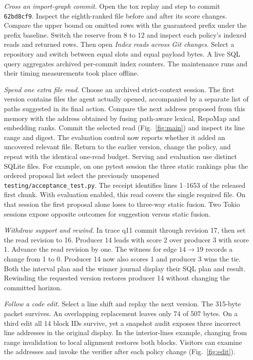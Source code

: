 \documentclass[conference]{IEEEtran}
\begin{document}
\textit{Cross an import-graph commit.} Open the tox replay and step to commit \texttt{62bd8cf9}. Inspect the eighth-ranked file before and after its score changes. Compare the upper bound on omitted rows with the guaranteed prefix under the prefix baseline. Switch the reserve from 8 to 12 and inspect each policy's indexed reads and returned rows. Then open \emph{Index reads across Git changes}. Select a repository and switch between equal slots and equal payload bytes. A live SQL query aggregates archived per-commit index counters. The maintenance runs and their timing measurements took place offline.

\textit{Spend one extra file read.} Choose an archived strict-context session. The first version contains files the agent actually opened, accompanied by a separate list of paths suggested in its final action. Compare the next address proposed from this memory with the address obtained by fusing path-aware lexical, RepoMap and embedding ranks. Commit the selected read (Fig.~\ref{fig:main}) and inspect its line range and digest. The evaluation control now reports whether it added an uncovered relevant file. Return to the earlier version, change the policy, and repeat with the identical one-read budget. Serving and evaluation use distinct SQLite files. For example, on one pytest session the three static rankings plus the ordered proposal list select the previously unopened \texttt{testing/acceptance\_test.py}. The receipt identifies lines 1--1653 of the released first chunk. With evaluation enabled, this read covers the single required file. On that session the first proposal alone loses to three-way static fusion. Two Tokio sessions expose opposite outcomes for suggestion versus static fusion.

\textit{Withdraw support and rewind.} In trace q11 commit through revision 17, then set the read revision to 16. Producer 14 leads with score 2 over producer 3 with score 1. Advance the read revision by one. The witness for edge $14\to19$ records a change from 1 to 0. Producer 14 now also scores 1 and producer 3 wins the tie. Both the interval plan and the winner journal display their SQL plan and result. Rewinding the requested version restores producer 14 without changing the committed horizon.

\textit{Follow a code edit.} Select a line shift and replay the next version. The 315-byte packet survives. An overlapping replacement leaves only 74 of 507 bytes. On a third edit all 14 block IDs survive, yet a snapshot audit exposes three incorrect line addresses in the original display. In the interior-lines example, changing from range invalidation to local alignment restores both blocks. Visitors can examine the addresses and invoke the verifier after each policy change (Fig.~\ref{fig:edit}).
\end{document}
